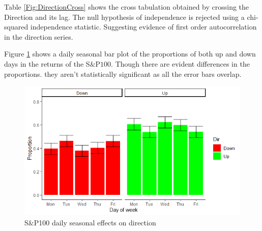 \documentclass[a4paper, 12pt]{report}
\begin{document}
    
    
    
    Table \ref{Fig:DirectionCross} shows the cross tabulation obtained by crossing the Direction and its lag. The null hypothesis of independence is rejected using a chi-squared independence statistic. Suggesting evidence of first order autocorrelation in the direction series. 
    
    Figure \ref{Fig:returnsseason} shows a daily seasonal bar plot of the proportions of both up and down days in the returns of the S$\&$P$100$. Though there are evident differences in the proportions. they aren't statistically significant as all the error bars overlap. 
    
    \begin{figure}[H]
    \centering
    \includegraphics[scale = 0.65]{graphs/DirSeasonalEffects.png}
    \caption{S$\&$P100 daily seasonal effects on direction}
    \label{Fig:returnsseason}
    \end{figure}
    
\end{document}
